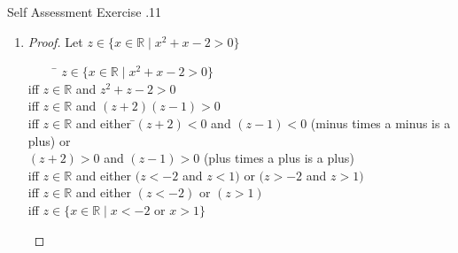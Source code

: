 \documentclass[../notes.tex]{subfiles}
\begin{document}
\begin{exercise}{Self Assessment Exercise \thechapter.11}
\begin{enumerate}
\begin{proof}
\begin{tabbing}
								iff \> $w \in \mathbb{Z}^{+}$ and \=$(1 < w < 4)$\\
								\> \> ($\mathbb{Z}^{+}$ as all the numbers are positive)\\
								iff \> $w \in \mathbb{Z}^{+}$ and $w \in \{2, 3\}$\\
								iff \> $w \in \{x \in \mathbb{Z}^{+} \mid x \in \{2, 3\}\}$\\
								iff \> $w \in \{x \in \mathbb{Z}^{+} \mid x$ is a prime factor of $6\}$
							\end{tabbing}
						\end{proof}
					\item {}
						\begin{proof}
							Let $z \in \{x \in \mathbb{R} \mid x^{2} + x - 2 > 0\}$
							\begin{tabbing}
								$\qquad$ \= $z \in \{x \in \mathbb{R} \mid x^{2} + x - 2 > 0\}$\\
								iff \> $z \in \mathbb{R}$ and $z^{2} + z - 2 > 0$\\
								iff \> $z \in \mathbb{R}$ and $(z + 2)(z - 1) > 0$\\
								iff \> $z \in \mathbb{R}$ and either \=$(z + 2) < 0$ and $(z - 1) < 0$ (minus times a minus is a plus) or\\
								\> \> $(z + 2)> 0$ and $(z - 1) > 0$ (plus times a plus is a plus)\\
								iff \> $z \in \mathbb{R}$ and either $(z < -2$ and $z < 1)$ or $(z > -2$ and $z > 1)$\\
								iff \> $z \in \mathbb{R}$ and either $(z < -2)$ or $(z > 1)$\\
								iff \> $z \in \{x \in \mathbb{R} \mid x < -2$ or $x > 1\}$
							\end{tabbing}
						\end{proof}
				\end{enumerate}
			\end{exercise}
			\pagebreak
\end{document}
